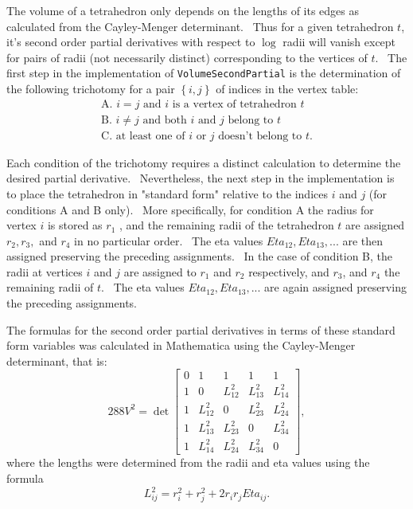 The volume of a tetrahedron only depends on the lengths of its edges as
calculated from the Cayley-Menger determinant. \ Thus for a given
tetrahedron $t$, it's second order partial derivatives with respect to $\log 
$ radii will vanish except for pairs of radii (not necessarily distinct)
corresponding to the vertices of $t$. \ The first step in the implementation
of \texttt{VolumeSecondPartial} is the determination of the following
trichotomy for a pair $\left\{ i,j\right\} $ of indices in the vertex table:%
\begin{equation*}
\begin{array}{l}
\text{A. \ }i=j\text{ and }i\text{ is a vertex of tetrahedron }t \\ 
\text{B. \ }i\neq j\text{ and both }i\text{ and }j\text{ belong to }t \\ 
\text{C. \ at least one of }i\text{ or }j\text{ doesn't belong to }t.%
\end{array}%
\end{equation*}

Each condition of the trichotomy requires a distinct calculation to
determine the desired partial derivative. \ Nevertheless, the next step in
the implementation is to place the tetrahedron in "standard form" relative
to the indices $i$ and $j$ (for conditions A and B only). \ More
specifically, for condition A the radius for vertex $i$ is stored as $r_{1}$%
, and the remaining radii of the tetrahedron $t$ are assigned $r_{2},r_{3},$
and $r_{4}$ in no particular order. \ The eta values $Eta_{12},Eta_{13},...$
are then assigned preserving the preceding assignments. \ In the case of
condition B, the radii at vertices $i$ and $j$ are assigned to $r_{1}$ and $%
r_{2}$ respectively, and $r_{3}$, and $r_{4}$ the remaining radii of $t$. \
The eta values $Eta_{12},Eta_{13},...$ are again assigned preserving the
preceding assignments.

The formulas for the second order partial derivatives in terms of these
standard form variables was calculated in Mathematica using the
Cayley-Menger determinant, that is:%
\begin{equation*}
288V^{2}=\det\left[ 
\begin{array}{ccccc}
0 & 1 & 1 & 1 & 1 \\ 
1 & 0 & L_{12}^{2} & L_{13}^{2} & L_{14}^{2} \\ 
1 & L_{12}^{2} & 0 & L_{23}^{2} & L_{24}^{2} \\ 
1 & L_{13}^{2} & L_{23}^{2} & 0 & L_{34}^{2} \\ 
1 & L_{14}^{2} & L_{24}^{2} & L_{34}^{2} & 0%
\end{array}
\right] ,
\end{equation*}
where the lengths were determined from the radii and eta values using the
formula%
\begin{equation*}
L_{ij}^{2}=r_{i}^{2}+r_{j}^{2}+2r_{i}r_{j}Eta_{ij}.
\end{equation*}

